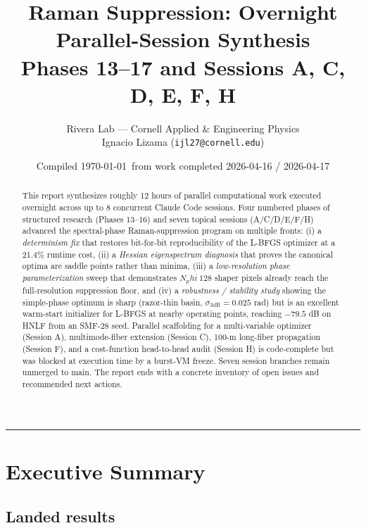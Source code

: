 \documentclass[11pt,letterpaper]{article}
\title{\bfseries Raman Suppression: Overnight Parallel-Session Synthesis\\
       \large Phases 13--17 and Sessions A, C, D, E, F, H}
\author{Rivera Lab --- Cornell Applied \& Engineering Physics\\
        {\small Ignacio Lizama (\texttt{ijl27@cornell.edu})}}
\date{Compiled \today~from work completed 2026-04-16 / 2026-04-17}
\def\varphi{phi}%
\def\mathrm#1{#1}%
\def\approx{~}%
\def\texttt#1{#1}%
\begin{document}
\maketitle
\thispagestyle{fancy}

\begin{abstract}
\noindent
This report synthesizes roughly 12 hours of parallel computational work executed overnight across up to 8 concurrent Claude Code sessions. Four numbered phases of structured research (Phases 13--16) and seven topical sessions (A/C/D/E/F/H) advanced the spectral-phase Raman-suppression program on multiple fronts:
(i) a \emph{determinism fix} that restores bit-for-bit reproducibility of the L-BFGS optimizer at a 21.4\% runtime cost,
(ii) a \emph{Hessian eigenspectrum diagnosis} that proves the canonical optima are saddle points rather than minima,
(iii) a \emph{low-resolution phase parameterization} sweep that demonstrates $\mathrm{N}_\varphi \approx 128$ shaper pixels already reach the full-resolution suppression floor, and
(iv) a \emph{robustness / stability study} showing the simple-phase optimum is sharp (razor-thin basin, $\sigma_{3\text{dB}} = 0.025$ rad) but is an excellent warm-start initializer for L-BFGS at nearby operating points, reaching $-79.5$ dB on HNLF from an SMF-28 seed.
Parallel scaffolding for a multi-variable optimizer (Session A), multimode-fiber extension (Session C), 100-m long-fiber propagation (Session F), and a cost-function head-to-head audit (Session H) is code-complete but was blocked at execution time by a burst-VM freeze. Seven session branches remain unmerged to \texttt{main}. The report ends with a concrete inventory of open issues and recommended next actions.
\end{abstract}

\tableofcontents
\vspace{1em}
\hrule

\section{Executive Summary}

\subsection{Landed results}
\end{document}
